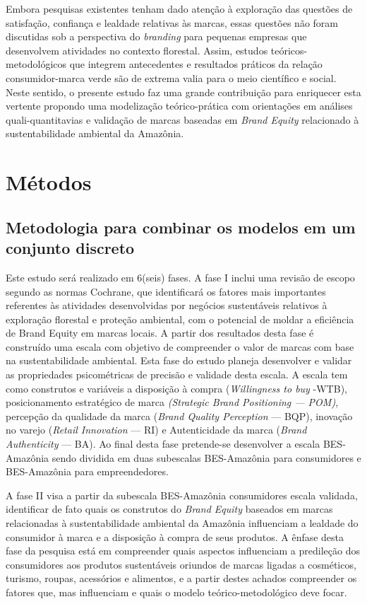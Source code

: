 Embora pesquisas existentes tenham dado atenção à exploração das questões de satisfação, confiança e lealdade relativas às marcas, essas questões não foram discutidas sob a perspectiva do \textit{branding} para pequenas empresas que desenvolvem atividades no contexto florestal. Assim, estudos teóricos-metodológicos que integrem antecedentes e resultados práticos da relação consumidor-marca verde são de extrema valia para o meio científico e social. Neste sentido, o presente estudo faz uma grande contribuição para enriquecer esta vertente propondo uma modelização teórico-prática com orientações em análises quali-quantitavias e validação de marcas baseadas em \textit{Brand Equity} relacionado à sustentabilidade ambiental da Amazônia. 


\section{Métodos}

\subsection{Metodologia para combinar os modelos em um conjunto discreto}

Este estudo será realizado em 6(seis) fases. A fase I inclui uma revisão de escopo segundo as normas Cochrane, que identificará os fatores mais importantes referentes às atividades desenvolvidas por negócios sustentáveis relativos à exploração florestal e proteção ambiental, com o potencial de moldar a eficiência de Brand Equity em marcas locais. A partir dos resultados desta fase é construído uma escala com objetivo de compreender o valor de marcas com base na sustentabilidade ambiental. Esta fase do estudo planeja desenvolver e validar as propriedades psicométricas de precisão e validade desta escala. A escala tem como  construtos e variáveis a disposição à compra (\textit{Willingness to buy} -WTB), posicionamento estratégico de marca \textit{(Strategic Brand Positioning — POM)}, percepção da qualidade da marca (\textit{Brand Quality Perception} — BQP), inovação no varejo (\textit{Retail Innovation} — RI) e Autenticidade da marca (\textit{Brand Authenticity} — BA). Ao final desta fase pretende-se desenvolver a escala BES-Amazônia sendo dividida em duas subescalas BES-Amazônia para consumidores e BES-Amazônia para empreendedores.

A fase II visa a partir da subescala BES-Amazônia consumidores escala validada, identificar de fato quais os construtos do \textit{Brand Equity} baseados em marcas relacionadas à sustentabilidade ambiental da Amazônia influenciam a lealdade do consumidor à marca e a disposição à compra de seus produtos. A ênfase desta fase da pesquisa está em compreender quais aspectos influenciam a predileção dos consumidores aos produtos sustentáveis oriundos de marcas ligadas a cosméticos, turismo, roupas, acessórios e alimentos, e a partir destes achados compreender os fatores que, mas influenciam e quais o modelo teórico-metodológico deve focar. 

